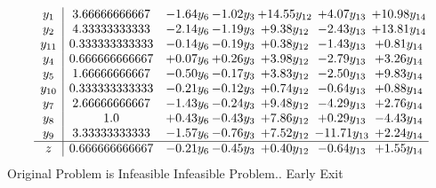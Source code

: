 \documentclass[9pt]{article}
\begin{document}
\[\begin{array}{c| c c@{\hskip 2pt} c@{\hskip 2pt} c@{\hskip 2pt} c@{\hskip 2pt} c@{\hskip 2pt} }
 y_{1}   &  3.66666666667 & -1.64 y_{6} & -1.02 y_{3} & + 14.55 y_{12} & +  4.07 y_{13} & + 10.98 y_{14}\\
 y_{2}   &  4.33333333333 & -2.14 y_{6} & -1.19 y_{3} & +  9.38 y_{12} & -2.43 y_{13} & + 13.81 y_{14}\\
 y_{11}   &  0.333333333333 & -0.14 y_{6} & -0.19 y_{3} & +  0.38 y_{12} & -1.43 y_{13} & +  0.81 y_{14}\\
 y_{4}   &  0.666666666667 & +  0.07 y_{6} & +  0.26 y_{3} & +  3.98 y_{12} & -2.79 y_{13} & +  3.26 y_{14}\\
 y_{5}   &  1.66666666667 & -0.50 y_{6} & -0.17 y_{3} & +  3.83 y_{12} & -2.50 y_{13} & +  9.83 y_{14}\\
 y_{10}   &  0.333333333333 & -0.21 y_{6} & -0.12 y_{3} & +  0.74 y_{12} & -0.64 y_{13} & +  0.88 y_{14}\\
 y_{7}   &  2.66666666667 & -1.43 y_{6} & -0.24 y_{3} & +  9.48 y_{12} & -4.29 y_{13} & +  2.76 y_{14}\\
 y_{8}   &  1.0 & +  0.43 y_{6} & -0.43 y_{3} & +  7.86 y_{12} & +  0.29 y_{13} & -4.43 y_{14}\\
 y_{9}   &  3.33333333333 & -1.57 y_{6} & -0.76 y_{3} & +  7.52 y_{12} & -11.71 y_{13} & +  2.24 y_{14}\\
\hline
z    &  0.666666666667 & -0.21 y_{6} & -0.45 y_{3} & +  0.40 y_{12} & -0.64 y_{13} & +  1.55 y_{14}\\
\end{array}\]
Original Problem is Infeasible
Infeasible Problem.. Early Exit
\end{document}
